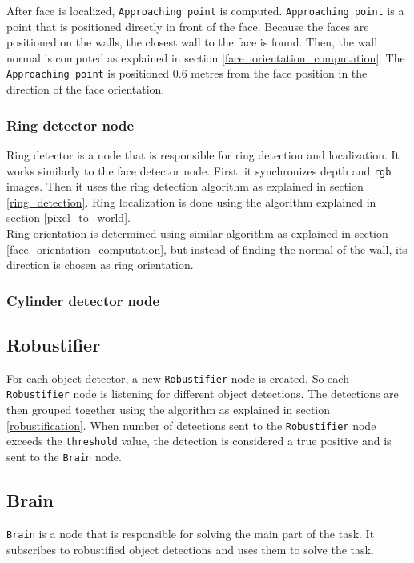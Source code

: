 \documentclass[12pt,a4paper]{article}
\begin{document}
	After face is localized, \texttt{Approaching point} is computed. \texttt{Approaching point} is a point that is positioned directly in front of the face. Because the faces are positioned on the walls, the closest wall to the face is found. Then, the wall normal is computed as explained in section \ref{face_orientation_computation}. The \texttt{Approaching point} is positioned 0.6 metres from the face position in the direction of the face orientation. \\

	\subsubsection{Ring detector node}
	Ring detector is a node that is responsible for ring detection and localization. It works similarly to the face detector node. First, it synchronizes depth and \texttt{rgb} images. Then it uses the ring detection algorithm as explained in section \ref{ring_detection}. Ring localization is done using the algorithm explained in section \ref{pixel_to_world}. \\
	
	Ring orientation is determined using similar algorithm as explained in section \ref{face_orientation_computation}, but instead of finding the normal of the wall, its direction is chosen as ring orientation. \\ %
	
	\subsubsection{Cylinder detector node}

	\subsection{Robustifier}
	For each object detector, a new \texttt{Robustifier} node is created. So each \texttt{Robustifier} node is listening for different object detections. The detections are then grouped together using the algorithm as explained in section \ref{robustification}. When number of detections sent to the \texttt{Robustifier} node exceeds the \texttt{threshold} value, the detection is considered a true positive and is sent to the \texttt{Brain} node. \\
	
	\subsection{Brain}
	\texttt{Brain} is a node that is responsible for solving the main part of the task. It subscribes to robustified object detections and uses them to solve the task. \\
	
\end{document}
